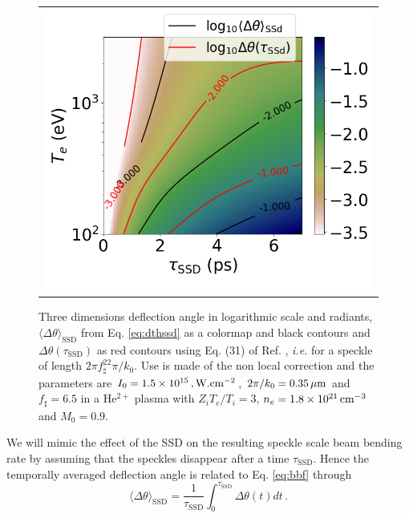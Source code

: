 \documentclass[%
 reprint,
 amsmath,amssymb,
 aps,
]{revtex4-1}
\begin{document}
\begin{figure}
\begin{tabular}{c}
\includegraphics[scale=0.39]{paramssd.png}%
\end{tabular}
\caption{ \label{fig:thssd}
Three dimensions deflection angle in  logarithmic scale  and  radiants, $\langle \Delta \theta \rangle_\mathrm{SSD}$ from Eq. \eqref{eq:dthssd} as a colormap and black contours and  $  \Delta \theta (\tau_\mathrm{SSD})$  as red contours using Eq. (31) of Ref. \cite{POP_Ruyer_2020}, \emph{i.e.} for a speckle of length $2\pi f_\sharp^22\pi/k_0$.  Use is made of the non local correction and the parameters are  $I_0=1.5\times 10^{15}\, ,\rm W.cm^{-2}$, $2\pi/k_0=0.35\,\rm\mu m$ and $f_\sharp=6.5$ in a He$^{2+}$ plasma  with $Z_iT_e/T_i=3$, $n_e=1.8\times 10^{21}\,\rm cm^{-3}$ and $M_0=0.9$.}
\end{figure}
We will mimic the effect of the SSD on the  resulting speckle scale beam bending rate  by assuming that the speckles disappear after a time $\tau_\mathrm{SSD}$. Hence the temporally averaged deflection angle is related to  Eq. \eqref{eq:bbf} through
\begin{equation}\label{eq:dthssd}
\langle \Delta \theta \rangle_\mathrm{SSD}=\frac{1}{\tau_\mathrm{SSD}}\int_0^{\tau_\mathrm{SSD}} \Delta \theta(t)dt\, .
\end{equation}
\end{document}

